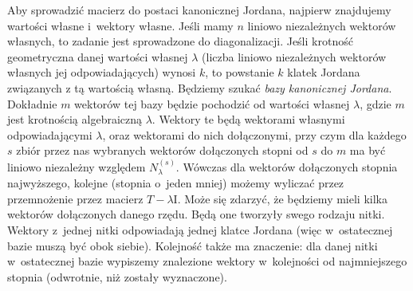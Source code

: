 \documentclass[a4paper, 12pt]{mwart}
\newcommand*{\im}{\mathrm{I}}
\theoremstyle{definition}
\theoremstyle{plain}
\theoremstyle{remark}
\begin{document}
Aby sprowadzić macierz do postaci kanonicznej Jordana, najpierw znajdujemy wartości własne i~wektory własne. Jeśli mamy $n$ liniowo niezależnych wektorów własnych, to zadanie jest sprowadzone do diagonalizacji. Jeśli krotność geometryczna danej wartości własnej $\lambda$ (liczba liniowo niezależnych wektorów własnych jej odpowiadających) wynosi $k$, to powstanie $k$ klatek Jordana związanych z tą wartością własną. Będziemy szukać \emph{bazy kanonicznej Jordana}. Dokładnie $m$ wektorów tej bazy będzie pochodzić od wartości własnej $\lambda$, gdzie $m$ jest krotnością algebraiczną $\lambda$. Wektory te będą wektorami własnymi odpowiadającymi $\lambda$, oraz wektorami do nich dołączonymi, przy czym dla każdego $s$ zbiór przez nas wybranych wektorów dołączonych stopni od $s$ do $m$ ma być liniowo niezależny względem $N_\lambda^{(s)}$. Wówczas dla wektorów dołączonych stopnia najwyższego, kolejne (stopnia o~jeden mniej) możemy wyliczać przez przemnożenie przez macierz $T-\lambda\im$. Może się zdarzyć, że będziemy mieli kilka wektorów dołączonych danego rzędu. Będą one tworzyły swego rodzaju nitki. Wektory z~jednej nitki odpowiadają jednej klatce Jordana (więc w~ostatecznej bazie muszą być obok siebie). Kolejność także ma znaczenie: dla danej nitki w~ostatecznej bazie wypiszemy znalezione wektory w~kolejności od najmniejszego stopnia (odwrotnie, niż zostały wyznaczone).
\end{document}
